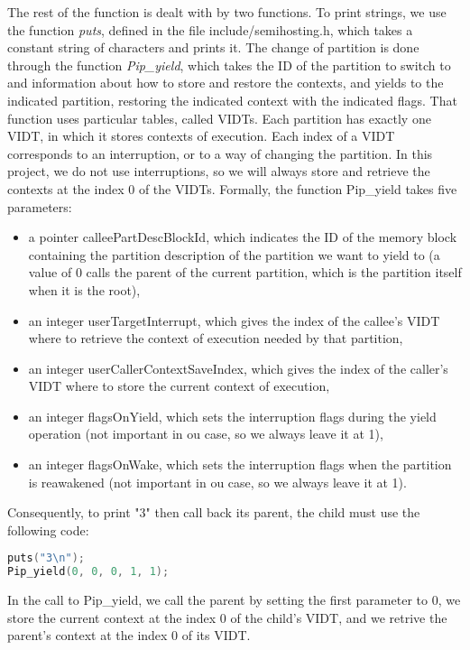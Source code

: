 \documentclass[10pt,a4paper,titlepage]{refart}
\begin{document}
The rest of the function is dealt with by two functions. To print strings, we use the function \textit{puts}, defined in the file 
include/semihosting{.}h, which takes a constant string of characters and prints it. The change of partition is done through the function 
\textit{Pip\_yield}, which takes the ID of the partition to switch to and information about how to store and restore the contexts, and 
yields to the indicated partition, restoring the indicated context with the indicated flags. That function uses particular tables, called 
VIDTs. Each partition has exactly one VIDT, in which it stores contexts of execution. Each index of a VIDT corresponds to an interruption, 
or to a way of changing the partition. In this project, we do not use interruptions, so we will always store and retrieve the contexts at 
the index 0 of the VIDTs. Formally, the function Pip\_yield takes five parameters:
\begin{itemize}
    \item a pointer calleePartDescBlockId, which indicates the ID of the memory block containing the partition description of the 
    partition we want to yield to (a value of 0 calls the parent of the current partition, which is the partition itself when it is the 
    root),
    \item an integer userTargetInterrupt, which gives the index of the callee's VIDT where to retrieve the context of execution needed by 
    that partition,
    \item an integer userCallerContextSaveIndex, which gives the index of the caller's VIDT where to store the current context of 
    execution,
    \item an integer flagsOnYield, which sets the interruption flags during the yield operation (not important in ou case, so we always 
    leave it at 1),
    \item an integer flagsOnWake, which sets the interruption flags when the partition is reawakened (not important in ou case, so we always 
    leave it at 1).
\end{itemize}
Consequently, to print "3" then call back its parent, the child must use the following code:
\begin{lstlisting}[language=C]
puts("3\n");
Pip_yield(0, 0, 0, 1, 1);
\end{lstlisting}
In the call to Pip\_yield, we call the parent by setting the first parameter to 0, we store the current context at the index 0 of the 
child's VIDT, and we retrive the parent's context at the index 0 of its VIDT.
\end{document}
